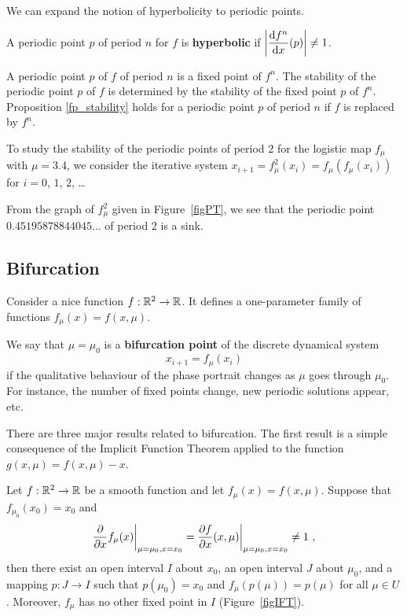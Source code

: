 We can expand the notion of hyperbolicity to periodic points.

\begin{defn}
A periodic point $p$ of period $n$ for $f$ is
{\bfseries hyperbolic}
if $\displaystyle \left| \dydx{f^n}{x}(p) \right| \neq 1$.
\end{defn}

A periodic point $p$ of $f$ of period $n$ is a fixed point of $f^n$.
The stability of the periodic point $p$ of $f$ is determined by the
stability of the fixed point $p$ of $f^n$.  Proposition
\ref{fp_stability} holds for a periodic point $p$ of period $n$ if
$f$ is replaced by $f^n$.

\begin{egg}
To study the stability of the periodic points of period $2$ for the
logistic map $f_\mu$ with $\mu = 3.4$, we consider the iterative system
$x_{i+1} = f_\mu^2(x_i) = f_\mu(f_\mu(x_i))$ for $i=0$, $1$, $2$, \ldots


From the graph of $f_\mu^2$ given in Figure~\ref{figPT}, we see that
the periodic point\\ $0.45195878844045\ldots$ of period $2$ is a sink.
\label{EggLogMap3}
\end{egg}

\subsection{Bifurcation}

Consider a nice function $f:\RR^2 \rightarrow \RR$.  It defines a
one-parameter family of functions $f_\mu(x) = f(x,\mu)$.

We say that $\mu = \mu_0$ is a
{\bfseries bifurcation point} of the
discrete dynamical system
\[
x_{i+1} = f_\mu(x_i)
\]
if the qualitative behaviour of the phase portrait changes as $\mu$
goes through $\mu_0$.  For instance, the number of fixed points
change, new periodic solutions appear, etc.

There are three major results related to bifurcation.  The first
result is a simple consequence of the Implicit Function Theorem
applied to the function $g(x,\mu) = f(x,\mu) - x$.

\begin{theorem}
Let $f:\RR^2 \rightarrow \RR$ be a smooth function and let
$f_\mu(x)= f(x,\mu)$.  Suppose that $f_{\mu_0}(x_0) = x_0$ and
\[
\pdfdx{f_{\mu}(x)}{x} \bigg|_{\mu=\mu_0,x=x_0}
= \pdydx{f}{x}(x,\mu) \bigg|_{\mu=\mu_0,x=x_0} \neq 1  \ ,
\]
then there exist an open interval $I$ about $x_0$, an open interval
$J$ about $\mu_0$, and a mapping $p:J\rightarrow I$ such that
$p(\mu_0)=x_0$ and $f_\mu(p(\mu))=p(\mu)$ for all $\mu \in U$.
Moreover, $f_\mu$ has no other fixed point in $I$ (Figure~\ref{figIFT}).
\label{IFTforDS}
\end{theorem}


